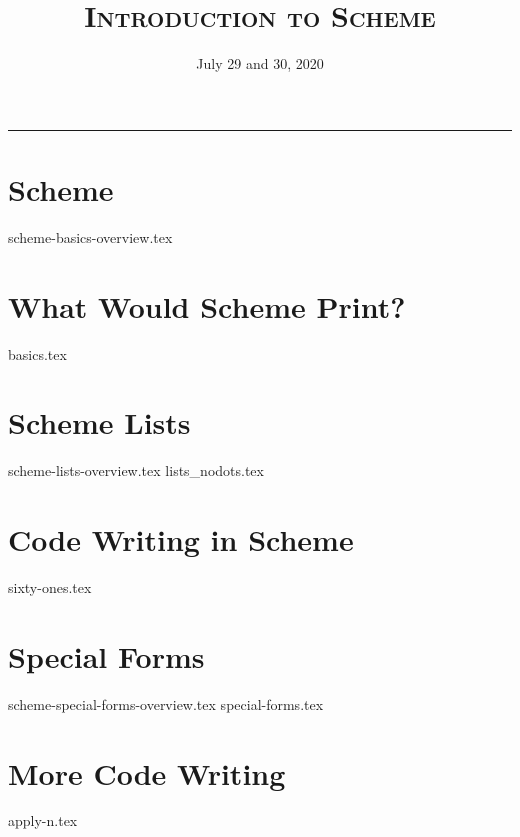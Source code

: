 \documentclass{exam}
\title{\textsc{Introduction to Scheme}}
\date{July 29 and 30, 2020}
\begin{document}
\maketitle
\rule{\textwidth}{0.15em}
\fontsize{12}{15}\selectfont


\section{Scheme}
{scheme-basics-overview.tex}

\section{What Would Scheme Print?}
\begin{questions}
{basics.tex}

\newpage
\section{Scheme Lists}
{scheme-lists-overview.tex}
\newpage
{lists_nodots.tex}


\newpage
\section{Code Writing in Scheme}
{sixty-ones.tex}


\newpage
\section{Special Forms}
{scheme-special-forms-overview.tex}
{special-forms.tex}

\newpage
\section{More Code Writing}
{apply-n.tex}

\end{questions}
\end{document}
